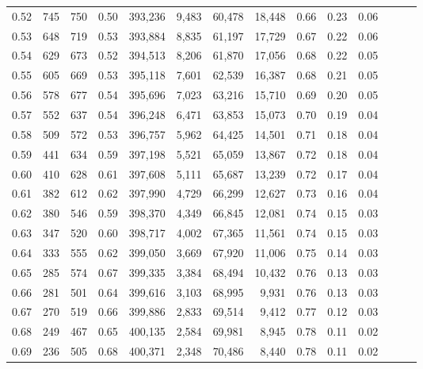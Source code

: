 \begin{tabular}{rrrrrrrrrrrrrr}
0.52 &     745 &    750 &  0.50 &  393,236 &    9,483 &  60,478 &  18,448 &  0.66 &  0.23 &      0.06 \\
0.53 &     648 &    719 &  0.53 &  393,884 &    8,835 &  61,197 &  17,729 &  0.67 &  0.22 &      0.06 \\
0.54 &     629 &    673 &  0.52 &  394,513 &    8,206 &  61,870 &  17,056 &  0.68 &  0.22 &      0.05 \\
0.55 &     605 &    669 &  0.53 &  395,118 &    7,601 &  62,539 &  16,387 &  0.68 &  0.21 &      0.05 \\
0.56 &     578 &    677 &  0.54 &  395,696 &    7,023 &  63,216 &  15,710 &  0.69 &  0.20 &      0.05 \\
0.57 &     552 &    637 &  0.54 &  396,248 &    6,471 &  63,853 &  15,073 &  0.70 &  0.19 &      0.04 \\
0.58 &     509 &    572 &  0.53 &  396,757 &    5,962 &  64,425 &  14,501 &  0.71 &  0.18 &      0.04 \\
0.59 &     441 &    634 &  0.59 &  397,198 &    5,521 &  65,059 &  13,867 &  0.72 &  0.18 &      0.04 \\
0.60 &     410 &    628 &  0.61 &  397,608 &    5,111 &  65,687 &  13,239 &  0.72 &  0.17 &      0.04 \\
0.61 &     382 &    612 &  0.62 &  397,990 &    4,729 &  66,299 &  12,627 &  0.73 &  0.16 &      0.04 \\
0.62 &     380 &    546 &  0.59 &  398,370 &    4,349 &  66,845 &  12,081 &  0.74 &  0.15 &      0.03 \\
0.63 &     347 &    520 &  0.60 &  398,717 &    4,002 &  67,365 &  11,561 &  0.74 &  0.15 &      0.03 \\
0.64 &     333 &    555 &  0.62 &  399,050 &    3,669 &  67,920 &  11,006 &  0.75 &  0.14 &      0.03 \\
0.65 &     285 &    574 &  0.67 &  399,335 &    3,384 &  68,494 &  10,432 &  0.76 &  0.13 &      0.03 \\
0.66 &     281 &    501 &  0.64 &  399,616 &    3,103 &  68,995 &   9,931 &  0.76 &  0.13 &      0.03 \\
0.67 &     270 &    519 &  0.66 &  399,886 &    2,833 &  69,514 &   9,412 &  0.77 &  0.12 &      0.03 \\
0.68 &     249 &    467 &  0.65 &  400,135 &    2,584 &  69,981 &   8,945 &  0.78 &  0.11 &      0.02 \\
0.69 &     236 &    505 &  0.68 &  400,371 &    2,348 &  70,486 &   8,440 &  0.78 &  0.11 &      0.02 \\

\end{tabular}
